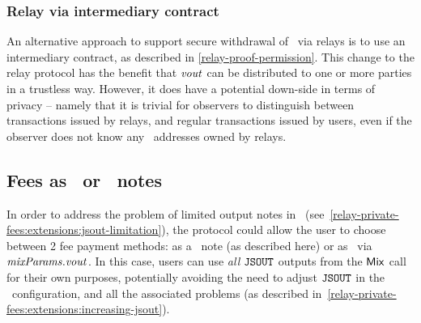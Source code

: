 \subsubsection{Relay via intermediary contract}\label{relay-private-fees:extensions:ether-output:intermediary}

An alternative approach to support secure withdrawal of \ether~via relays is to use an intermediary contract, as described in \cref{relay-proof-permission}. This change to the relay protocol has the benefit that $\mathit{vout}$ can be distributed to one or more parties in a trustless way. However, it does have a potential down-side in terms of privacy -- namely that it is trivial for observers to distinguish between transactions issued by relays, and regular transactions issued by users, even if the observer does not know any \ethereum~addresses owned by relays.


\subsection{Fees as \ether~or \zeth~notes}

In order to address the problem of limited output notes in \zeth~(see~\cref{relay-private-fees:extensions:jsout-limitation}), the protocol could allow the user to choose between 2 fee payment methods: as a \zeth~note (as described here) or as \ether~via $\mathit{mixParams}.\mathit{vout}$. In this case, users can use \emph{all} $\mathtt{JSOUT}$ outputs from the $\mathsf{Mix}$ call for their own purposes, potentially avoiding the need to adjust $\mathtt{JSOUT}$ in the \zeth~configuration, and all the associated problems (as described in~\cref{relay-private-fees:extensions:increasing-jsout}).

